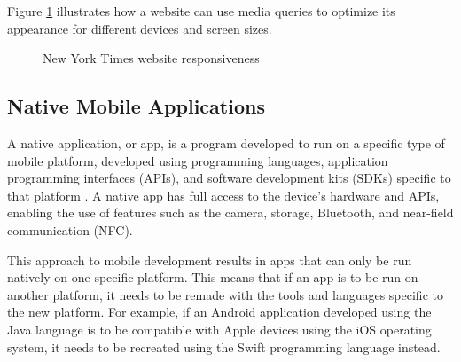 \documentclass[a4paper,12pt]{article}
\begin{document}
Figure \ref{fig:responsiveness} illustrates how a website can use media queries to optimize its appearance for different devices and screen sizes.

\vspace{-10px}
\begin{figure}[h]%
	\centering
	\quad
	\caption{New York Times website responsiveness}%
	\label{fig:responsiveness}%
\end{figure}
\vspace{-10px}

\subsection{Native Mobile Applications}
\label{Theory_nativeApps}
A native application, or app, is a program developed to run on a specific type of mobile platform, developed using programming languages, application programming interfaces (APIs), and software development kits (SDKs) specific to that platform \cite{crossplatform_taxonomy, mobile_web_apps_2013}. A native app has full access to the device’s hardware and APIs, enabling the use of features such as the camera, storage, Bluetooth, and near-field communication (NFC).

This approach to mobile development results in apps that can only be run natively on one specific platform. This means that if an app is to be run on another platform, it needs to be remade with the tools and languages specific to the new platform. For example, if an Android application developed using the Java language is to be compatible with Apple devices using the iOS operating system, it needs to be recreated using the Swift programming language instead.
\end{document}
